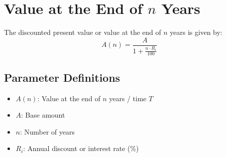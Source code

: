 \documentclass[12pt]{article}
\begin{document}
\section{\texorpdfstring{Value at the End of $n$ Years}{Value at the End of n Years}}
The discounted present value or value at the end of $n$ years is given by:
\[
A(n) = \frac{A}{1 + \frac{n \cdot R_i}{100}}
\]

\subsection*{Parameter Definitions}
\begin{itemize}
    \item $A(n)$: Value at the end of $n$ years / time $T$
    \item $A$: Base amount
    \item $n$: Number of years
    \item $R_i$: Annual discount or interest rate (\%)
\end{itemize}
\end{document}

